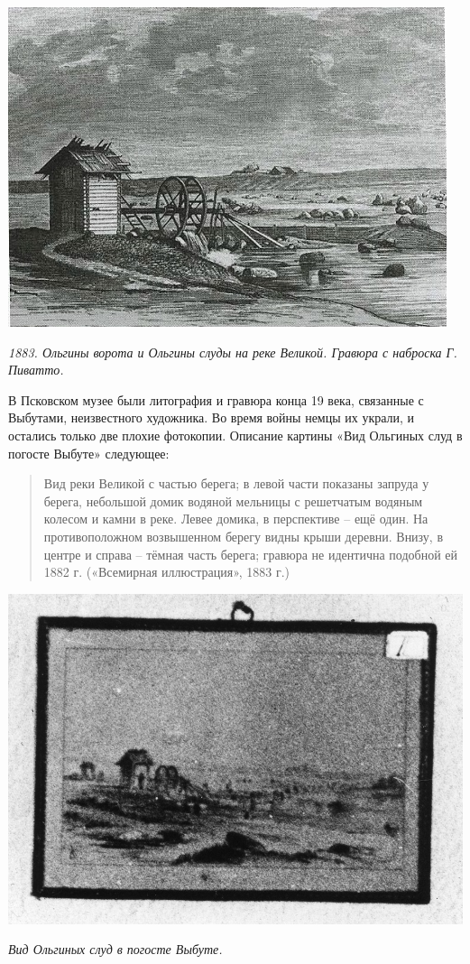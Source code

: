 \begin{center}
\includegraphics[width=\linewidth]{chast-volga/vybuty/sludy2.jpg}

\textit{1883. Ольгины ворота и Ольгины слуды на реке Великой. Гравюра с наброска Г. Пиватто.}
\end{center}


В Псковском музее были литография и гравюра конца 19 века, связанные с Выбутами, неизвестного художника. Во время войны немцы их украли, и остались только две плохие фотокопии. Описание картины «Вид Ольгиных слуд в погосте Выбуте» следующее:

\begin{quotation}
Вид реки Великой с частью берега; в левой части показаны запруда у берега, небольшой домик водяной мельницы с решетчатым водяным колесом и камни в реке. Левее домика, в перспективе – ещё один. На противоположном возвышенном берегу видны крыши деревни. Внизу, в центре и справа – тёмная часть берега; гравюра не идентична подобной ей 1882 г. («Всемирная иллюстрация», 1883 г.)
\end{quotation}


\begin{center}
\includegraphics[width=0.90\linewidth]{chast-volga/vybuty/vyb-sludy.jpg}

\textit{Вид Ольгиных слуд в погосте Выбуте.}
\end{center}

